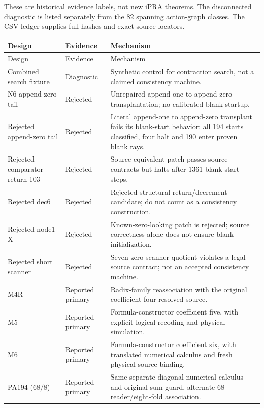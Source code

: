 
These are historical evidence labels, not new iPRA theorems. The disconnected
diagnostic is listed separately from the 82 spanning action-graph classes.
The CSV ledger supplies full hashes and exact source locators.
\begingroup\fontsize{9}{10.5}\selectfont
\setlength{\tabcolsep}{3pt}
\begin{longtable}{@{}p{.25\linewidth}p{.17\linewidth}p{.53\linewidth}@{}}
\toprule
Design & Evidence & Mechanism \\
\midrule\endfirsthead
\toprule Design & Evidence & Mechanism \\
\midrule\endhead
\bottomrule\endfoot
Combined search fixture & Diagnostic & Synthetic control for contraction search, not a claimed consistency machine. \\
N6 append-zero tail & Rejected & Unrepaired append-one to append-zero transplantation; no calibrated blank startup. \\
Rejected append-zero tail & Rejected & Literal append-one to append-zero transplant fails its blank-start behavior: all 194 starts classified, four halt and 190 enter proven blank rays. \\
Rejected comparator return 103 & Rejected & Source-equivalent patch passes source contracts but halts after 1361 blank-start steps. \\
Rejected dec6 & Rejected & Rejected structural return/decrement candidate; do not count as a consistency construction. \\
Rejected node1-X & Rejected & Known-zero-looking patch is rejected; source correctness alone does not ensure blank initialization. \\
Rejected short scanner & Rejected & Seven-zero scanner quotient violates a legal source contract; not an accepted consistency machine. \\
M4R & Reported primary & Radix-family reassociation with the original coefficient-four resolved source. \\
M5 & Reported primary & Formula-constructor coefficient five, with explicit logical recoding and physical simulation. \\
M6 & Reported primary & Formula-constructor coefficient six, with translated numerical calculus and fresh physical source binding. \\
PA194 (68/8) & Reported primary & Same separate-diagonal numerical calculus and original sum guard, alternate 68-reader/eight-fold association. \\

\end{longtable}
